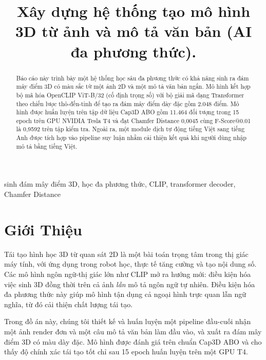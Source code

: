 \documentclass[conference]{IEEEtran}
\begin{document}
\title{Xây dựng hệ thống tạo mô hình 3D từ ảnh và mô tả văn bản (AI đa phương thức).}

\author{
}

\maketitle

\begin{abstract}
Báo cáo này trình bày một hệ thống học sâu đa phương thức có khả năng sinh ra đám mây điểm 3D có màu sắc từ một ảnh 2D và một mô tả văn bản ngắn. Mô hình kết hợp bộ mã hóa OpenCLIP ViT-B/32 (cố định trọng số) với bộ giải mã dạng Transformer theo chiến lược thô-đến-tinh để tạo ra đám mây điểm dày đặc gồm 2.048 điểm. Mô hình được huấn luyện trên tập dữ liệu Cap3D ABO gồm 11.464 đối tượng trong 15 epoch trên GPU NVIDIA Tesla T4 và đạt Chamfer Distance 0,0045 cùng F-Score@0.01 là 0,9592 trên tập kiểm tra. Ngoài ra, một module dịch tự động tiếng Việt sang tiếng Anh được tích hợp vào pipeline suy luận nhằm cải thiện kết quả khi người dùng nhập mô tả bằng tiếng Việt.
\end{abstract}

\begin{IEEEkeywords}
sinh đám mây điểm 3D, học đa phương thức, CLIP, transformer decoder, Chamfer Distance
\end{IEEEkeywords}

\section{Giới Thiệu}

Tái tạo hình học 3D từ quan sát 2D là một bài toán trọng tâm trong thị giác máy tính, với ứng dụng trong robot học, thực tế tăng cường và tạo nội dung số. Các mô hình ngôn ngữ-thị giác lớn như CLIP \cite{clip} mở ra hướng mới: điều kiện hóa việc sinh 3D đồng thời trên cả ảnh \emph{lẫn} mô tả ngôn ngữ tự nhiên. Điều kiện hóa đa phương thức này giúp mô hình tận dụng cả ngoại hình trực quan lẫn ngữ nghĩa, từ đó cải thiện chất lượng tái tạo.

Trong đồ án này, chúng tôi thiết kế và huấn luyện một pipeline đầu-cuối nhận một ảnh render đơn và một câu mô tả văn bản làm đầu vào, và xuất ra đám mây điểm 3D có màu dày đặc. Mô hình được đánh giá trên chuẩn Cap3D ABO \cite{cap3d} và cho thấy độ chính xác tái tạo tốt chỉ sau 15 epoch huấn luyện trên một GPU T4.
\end{document}
